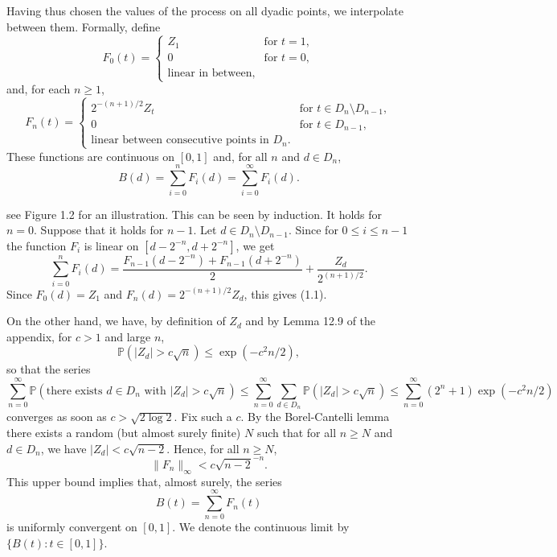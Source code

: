 \documentclass{article}
\begin{document}
Having thus chosen the values of the process on all dyadic points, we interpolate between them. Formally, define
\[
    F_0(t) = 
    \begin{cases} 
        Z_1 & \text{for } t = 1, \\
        0 & \text{for } t = 0, \\
        \text{linear in between}, 
    \end{cases}
\]
and, for each $n \geq 1$,
\[
    F_n(t) = 
    \begin{cases} 
        2^{-(n+1)/2} Z_t & \text{for } t \in D_n \setminus D_{n-1}, \\
        0 & \text{for } t \in D_{n-1}, \\
        \text{linear between consecutive points in } D_n.
    \end{cases}
\]
These functions are continuous on $[0, 1]$ and, for all $n$ and $d \in D_n$,
\[
    B(d) = \sum_{i=0}^{n} F_i(d) = \sum_{i=0}^{\infty} F_i(d). \tag{1.1}
\]


see Figure 1.2 for an illustration. This can be seen by induction. It holds for $n = 0$. Suppose that it holds for $n - 1$. Let $d \in D_n \setminus D_{n-1}$. Since for $0 \leq i \leq n - 1$ the function $F_i$ is linear on $[d - 2^{-n}, d + 2^{-n}]$, we get
\[
    \sum_{i=0}^{n} F_i(d) = \frac{F_{n-1}(d - 2^{-n}) + F_{n-1}(d + 2^{-n})}{2} + \frac{Z_d}{2^{(n+1)/2}}.
\]
Since $F_0(d) = Z_1$ and $F_n(d) = 2^{-(n+1)/2} Z_d$, this gives (1.1).

On the other hand, we have, by definition of $Z_d$ and by Lemma 12.9 of the appendix, for $c > 1$ and large $n$,
\[
    \mathbb{P}(|Z_d| > c\sqrt{n}) \leq \exp\left( -c^2 n / 2 \right),
\]
so that the series
\[
    \sum_{n=0}^{\infty} \mathbb{P} \left( \text{there exists } d \in D_n \text{ with } |Z_d| > c \sqrt{n} \right)
    \leq \sum_{n=0}^{\infty} \sum_{d \in D_n} \mathbb{P}(|Z_d| > c\sqrt{n})
    \leq \sum_{n=0}^{\infty} (2^n + 1) \exp\left( -c^2 n / 2 \right)
\]
converges as soon as $c > \sqrt{2 \log 2}$. Fix such a $c$. By the Borel-Cantelli lemma there exists a random (but almost surely finite) $N$ such that for all $n \geq N$ and $d \in D_n$, we have $|Z_d| < c \sqrt{n - 2}$. Hence, for all $n \geq N$,
\[
    \| F_n \|_{\infty} < c \sqrt{n - 2}^{-n}. \tag{1.2}
\]
This upper bound implies that, almost surely, the series
\[
    B(t) = \sum_{n=0}^{\infty} F_n(t)
\]
is uniformly convergent on $[0, 1]$. We denote the continuous limit by $\{ B(t) : t \in [0, 1] \}$.
\end{document}
